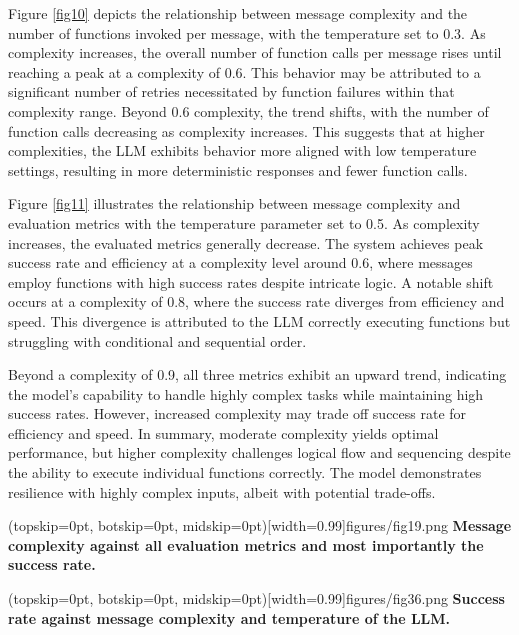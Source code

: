 \documentclass{ieeeaccess}
\begin{document}
Figure \ref{fig10} depicts the relationship between message complexity and the number of functions invoked per message, with the temperature set to 0.3. As complexity increases, the overall number of function calls per message rises until reaching a peak at a complexity of 0.6. This behavior may be attributed to a significant number of retries necessitated by function failures within that complexity range. Beyond 0.6 complexity, the trend shifts, with the number of function calls decreasing as complexity increases. This suggests that at higher complexities, the LLM exhibits behavior more aligned with low temperature settings, resulting in more deterministic responses and fewer function calls.

Figure \ref{fig11} illustrates the relationship between message complexity and evaluation metrics with the temperature parameter set to 0.5. As complexity increases, the evaluated metrics generally decrease. The system achieves peak success rate and efficiency at a complexity level around 0.6, where messages employ functions with high success rates despite intricate logic. A notable shift occurs at a complexity of 0.8, where the success rate diverges from efficiency and speed. This divergence is attributed to the LLM correctly executing functions but struggling with conditional and sequential order.

Beyond a complexity of 0.9, all three metrics exhibit an upward trend, indicating the model's capability to handle highly complex tasks while maintaining high success rates. However, increased complexity may trade off success rate for efficiency and speed. In summary, moderate complexity yields optimal performance, but higher complexity challenges logical flow and sequencing despite the ability to execute individual functions correctly. The model demonstrates resilience with highly complex inputs, albeit with potential trade-offs.

\Figure[t!](topskip=0pt, botskip=0pt,
midskip=0pt)[width=0.99\columnwidth]{{figures/fig19.png}}
{ \textbf{Message complexity against all evaluation metrics and most importantly the success rate.}\label{fig11}}



\Figure[b!](topskip=0pt, botskip=0pt,
midskip=0pt)[width=0.99\columnwidth]{{figures/fig36.png}}
{ \textbf{Success rate against message complexity and temperature of the LLM.}\label{fig12}}


\end{document}
